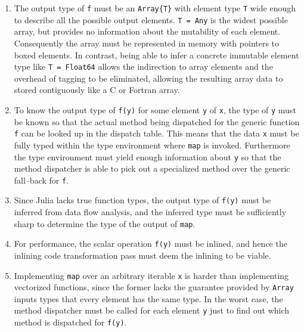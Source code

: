 \documentclass[pldi]{sigplanconf-pldi15}
\begin{document}
\begin{enumerate}

	\item The output type of \verb|f| must be an \verb|Array{T}| with
	element type \verb|T| wide enough to describe all the possible output
	elements. \verb|T = Any| is the widest possible array, but provides no
	information about the mutability of each element. Consequently the
	array must be represented in memory with pointers to boxed elements. In
	contrast, being able to infer a concrete immutable element type like
	\verb|T = Float64| allows the indirection to array elements and the
	overhead of tagging to be eliminated, allowing the resulting array data
	to stored contiguously like a C or Fortran array.

	\item To know the output type of \verb|f(y)| for some element \verb|y|
	of \verb|x|, the type of \verb|y| must be known so that the actual
	method being dispatched for the generic function \verb|f| can be looked
	up in the dispatch table. This means that the data \verb|x| must be
	fully typed within the type environment where \verb|map| is invoked.
	Furthermore the type environment must yield enough information about
	\verb|y| so that the method dispatcher is able to pick out a
	specialized method over the generic fall--back for \verb|f|.

	\item Since Julia lacks true function types, the output type of
	\verb|f(y)| must be inferred from data flow analysis, and the inferred
	type must be sufficiently sharp to determine the type of the output of
	\verb|map|.

	\item For performance, the scalar operation \verb|f(y)| must be
	inlined, and hence the inlining code transformation pass must deem the
	inlining to be viable.

	\item Implementing \verb|map| over an arbitrary iterable \verb|x| is
	harder than implementing vectorized functions, since the former lacks
	the guarantee provided by \verb|Array| inputs types that every element
	has the same type. In the worst case, the method dispatcher must be
	called for each element \verb|y| just to find out which method is
	dispatched for \verb|f(y)|.

\end{enumerate}
\end{document}
